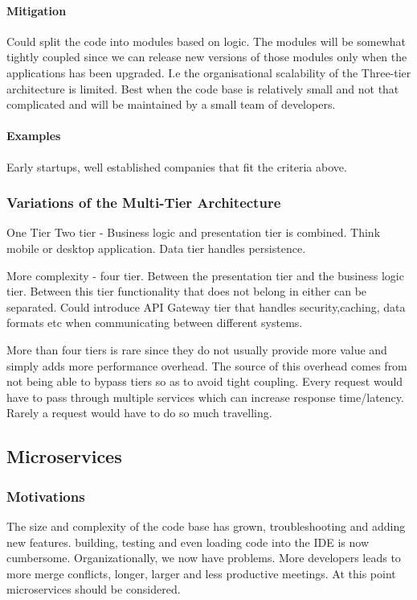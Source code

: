 \documentclass[a4paper, 11pt]{book}
\begin{document}
    \paragraph{Mitigation}
    Could split the code into modules based on logic.
    The modules will be somewhat tightly coupled since we can release new versions of those modules only when the applications has been upgraded.
    I.e the organisational scalability of the Three-tier architecture is limited.
    Best when the code base is relatively small and not that complicated and will be maintained by a small team of developers.

    \paragraph{Examples}
    Early startups, well established companies that fit the criteria above.

    \subsubsection{Variations of the Multi-Tier Architecture}
    One Tier
    Two tier - Business logic and presentation tier is combined.
    Think mobile or desktop application.
    Data tier handles persistence.

    More complexity - four tier.
    Between the presentation tier and the business logic tier.
    Between this tier functionality that does not belong in either can be separated.
    Could introduce API Gateway tier that handles security,caching, data formats etc when communicating between different systems.

    More than four tiers is rare since they do not usually provide more value and simply adds more performance overhead.
    The source of this overhead comes from not being able to bypass tiers so as to avoid tight coupling.
    Every request would have to pass through multiple services which can increase response time/latency.
    Rarely a request would have to do so much travelling.

    \subsection{Microservices}

    \subsubsection{Motivations}
    The size and complexity of the code base has grown, troubleshooting and adding new features.
    building, testing and even loading code into the IDE is now cumbersome.
    Organizationally, we now have problems.
    More developers leads to more merge conflicts, longer, larger and less productive meetings.
    At this point microservices should be considered.
\end{document}
